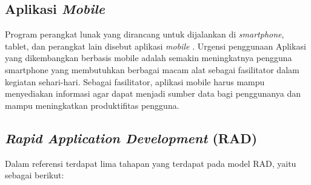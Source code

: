 \begin{flushleft}
\begin{justify}
        \subsection{Aplikasi \textit{Mobile}}
        Program perangkat lunak yang dirancang untuk dijalankan di \emph{smartphone}, tablet, dan perangkat 
        lain disebut aplikasi \emph{mobile} \cite{mobile}. Urgensi penggunaan Aplikasi yang dikembangkan 
        berbasis mobile adalah semakin meningkatnya pengguna smartphone yang membutuhkan berbagai macam 
        alat sebagai fasilitator dalam kegiatan sehari-hari. Sebagai fasilitator, aplikasi mobile harus mampu menyediakan informasi agar dapat menjadi sumber data bagi penggunanya dan mampu meningkatkan produktifitas pengguna. 
        \\
        \subsection{\textit{Rapid Application Development} (RAD)}
        Dalam referensi \cite{Sukamto} terdapat lima tahapan yang terdapat pada model RAD, yaitu sebagai berikut:
        
        \begin{figure}[ht]
            \centering
           

\end{figure}
\end{justify}
\end{flushleft}
